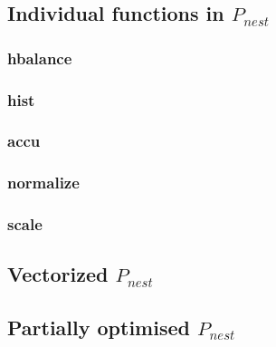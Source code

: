 \documentclass{article}
\newcommand{\ndpn}[0]{$P_{nest}$}
\begin{document}
    \subsection{Individual functions in \ndpn}
    
      \subsubsection{hbalance}
        
        
        
      \subsubsection{hist}
        
        
        
      \subsubsection{accu}
        
        
        
      \subsubsection{normalize}
        
        
        
      \subsubsection{scale}
        
        
      
    \subsection{Vectorized \ndpn }
      
      
  
    \subsection{Partially optimised \ndpn}
      
      
  
  
  \newpage
  
  
  
\end{document}
